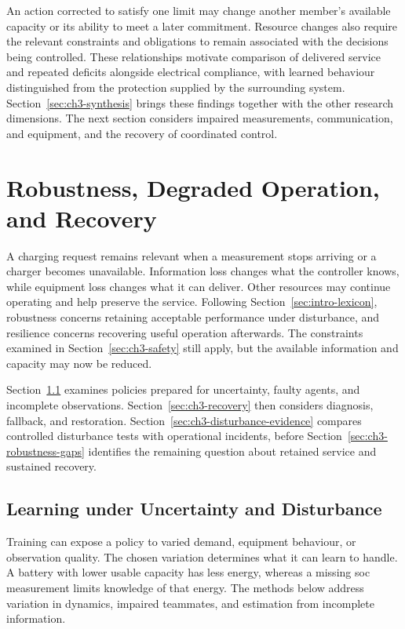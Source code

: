 An action corrected to satisfy one limit may change another member's available capacity or its ability to meet a later commitment. Resource changes also require the relevant constraints and obligations to remain associated with the decisions being controlled. These relationships motivate comparison of delivered service and repeated deficits alongside electrical compliance, with learned behaviour distinguished from the protection supplied by the surrounding system. Section~\ref{sec:ch3-synthesis} brings these findings together with the other research dimensions. The next section considers impaired measurements, communication, and equipment, and the recovery of coordinated control.


\FloatBarrier
\section{Robustness, Degraded Operation, and Recovery}
\label{sec:ch3-robustness}

A charging request remains relevant when a measurement stops arriving or a charger becomes unavailable. Information loss changes what the controller knows, while equipment loss changes what it can deliver. Other resources may continue operating and help preserve the service. Following Section~\ref{sec:intro-lexicon}, robustness concerns retaining acceptable performance under disturbance, and resilience concerns recovering useful operation afterwards. The constraints examined in Section~\ref{sec:ch3-safety} still apply, but the available information and capacity may now be reduced.

Section~\ref{sec:ch3-robust-learning} examines policies prepared for uncertainty, faulty agents, and incomplete observations. Section~\ref{sec:ch3-recovery} then considers diagnosis, fallback, and restoration. Section~\ref{sec:ch3-disturbance-evidence} compares controlled disturbance tests with operational incidents, before Section~\ref{sec:ch3-robustness-gaps} identifies the remaining question about retained service and sustained recovery.

\subsection{Learning under Uncertainty and Disturbance}
\label{sec:ch3-robust-learning}

Training can expose a policy to varied demand, equipment behaviour, or observation quality. The chosen variation determines what it can learn to handle. A battery with lower usable capacity has less energy, whereas a missing \gls{soc} measurement limits knowledge of that energy. The methods below address variation in dynamics, impaired teammates, and estimation from incomplete information.

